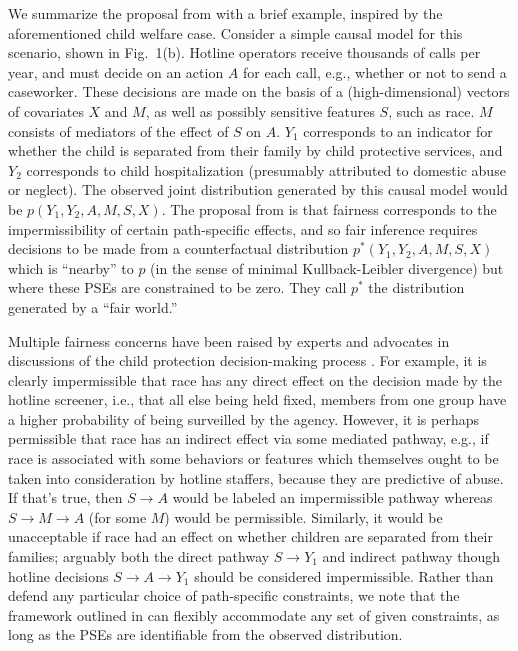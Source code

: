 \documentclass{article}
\begin{document}
We summarize the proposal from \citet{NabiShpitser18Fair} with a brief example, inspired by the aforementioned child welfare case. Consider a simple causal model for this scenario, shown in Fig.\ 1(b). Hotline operators receive thousands of calls per year, and must decide on an action $A$ for each call, e.g., whether or not to send a caseworker. These decisions are made on the basis of a (high-dimensional) vectors of covariates $X$ and $M$, as well as possibly sensitive features $S$, such as race. $M$ consists of mediators of the effect of $S$ on $A$. $Y_1$ corresponds to an indicator for whether the child is separated from their family by child protective services, and $Y_2$ corresponds to child hospitalization (presumably attributed to domestic abuse or neglect). The observed joint distribution generated by this causal model would be $p(Y_1,Y_2,A,M,S,X)$. The proposal from \citet{NabiShpitser18Fair} is that fairness corresponds to the impermissibility of certain path-specific effects, and so fair inference requires decisions to be made from a counterfactual distribution $p^*(Y_1,Y_2,A,M,S,X)$ which is ``nearby'' to $p$ (in the sense of minimal Kullback-Leibler divergence) but where these PSEs are constrained to be zero. They call $p^*$ the distribution generated by a ``fair world.''

Multiple fairness concerns have been raised by experts and advocates in discussions of the child protection decision-making process \cite{chouldechova2018case, Hurley18child}. For example, it is clearly impermissible that race has any direct effect on the decision made by the hotline screener, i.e., that all else being held fixed, members from one group have a higher probability of being surveilled by the agency. However, it is perhaps permissible that race has an indirect effect via some mediated pathway, e.g., if race is associated with some behaviors or features which themselves ought to be taken into consideration by hotline staffers, because they are predictive of abuse. If that's true, then $S \rightarrow A$ would be labeled an impermissible pathway whereas $S \rightarrow M \rightarrow A$ (for some $M$) would be permissible. Similarly, it would be unacceptable if race had an effect on whether children are separated from their families; arguably both the direct pathway $S \rightarrow Y_1$ and indirect pathway though hotline decisions $S \rightarrow A \rightarrow Y_1$ should be considered impermissible. Rather than defend any particular choice of path-specific constraints, we note that the framework outlined in \citet{NabiShpitser18Fair} can flexibly accommodate any set of given constraints, as long as the PSEs are identifiable from the observed distribution.
\end{document}
